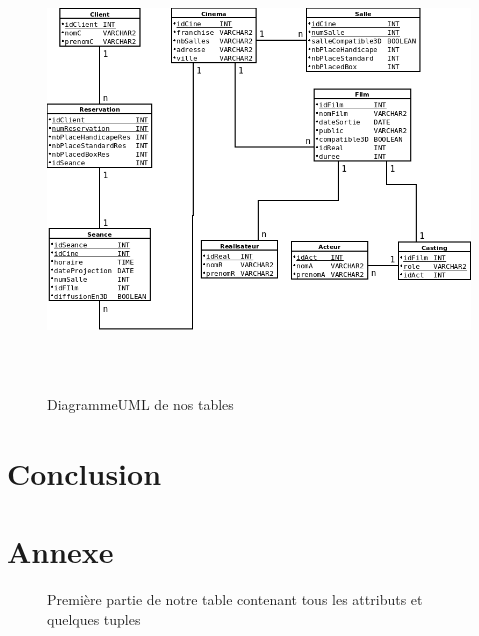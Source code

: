 \documentclass[a4paper,sffamily,12pt]{article}
\begin{document}
				\begin{figure}[!h]		
					\centering
					{\includegraphics[height=11cm]{picture/DiagrammeUML.png}}
					\caption{DiagrammeUML de nos tables}
					\label{UML}	
				\end{figure}		

		\section{Conclusion}

			\vspace{0.5cm}
			
			
			

			\newpage

			\section{Annexe}
							
				\begin{figure}[!h]		
					\centering
					\caption{Première partie de notre table contenant tous les attributs et quelques tuples}
					\label{table_p1}	
				\end{figure}			
\end{document}

